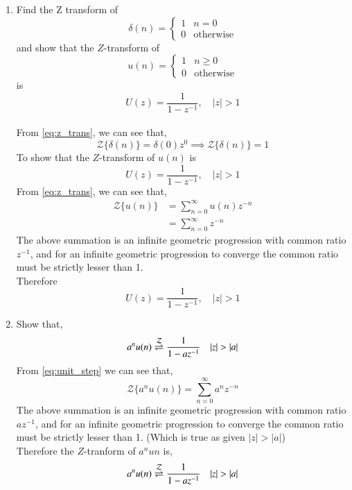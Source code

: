 \documentclass[journal,12pt,twocolumn]{IEEEtran}
\renewcommand\thesection{\arabic{section}}
\begin{document}
\begin{enumerate}[label=\thesection.\arabic*
,ref=\thesection.\theenumi]
\item Find the Z transform of 
\begin{equation}
\delta(n)
=
\begin{cases}
1 & n = 0
\\
0 & \text{otherwise}
\end{cases}
\end{equation}
and show that the $Z$-transform of
\begin{equation}
\label{eq:unit_step}
u(n)
=
\begin{cases}
1 & n \ge 0
\\
0 & \text{otherwise}
\end{cases}
\end{equation}
is
\begin{equation}
U(z) = \frac{1}{1-z^{-1}}, \quad |z|>1
\end{equation}
\\
\solution From \eqref{eq:z_trans}, we can see that,
\begin{equation}
{\mathcal {Z}}\{\delta(n)\} = \delta(0)z^{0}
\implies {\mathcal {Z}}\{\delta(n)\} = 1
\end{equation}
To show that the $Z$-transform of $u(n)$ is
\begin{equation}
U(z) = \frac{1}{1-z^{-1}}, \quad |z|>1
\end{equation}
From \eqref{eq:z_trans}, we can see that,
\begin{align}
{\mathcal {Z}}\{u(n)\} &=\sum _{n=0}^{\infty }u(n)z^{-n}
\\
&=\sum _{n=0}^{\infty }z^{-n}
\end{align}
The above summation is an infinite geometric progression with common ratio $z^{-1}$, and for an infinite geometric progression to converge the common ratio must be strictly lesser than 1.
\\
Therefore
\begin{equation}
    U(z) = \frac{1}{1-z^{-1}}, \quad |z|>1
\end{equation}


\item Show that,
\begin{equation}
\label{eq:anun}
    a^nu(n) \overset{\mathcal{Z}}{ \rightleftharpoons} \frac{1}{1-az^{-1}} \quad |z| > |a|
\end{equation}
\solution From \eqref{eq:unit_step} we can see that,
\begin{equation}
    {\mathcal {Z}}\{a^{n}u(n)\} =\sum _{n=0}^{\infty }a^{n}z^{-n}
\end{equation}
The above summation is an infinite geometric progression with common ratio $az^{-1}$, and for an infinite geometric progression to converge the common ratio must be strictly lesser than 1. (Which is true as given $|z|>|a|$)
\\
Therefore the $Z$-tranform of $a^{n}u{n}$ is,
\begin{equation}
    a^nu(n) \overset{\mathcal{Z}}{ \rightleftharpoons} \frac{1}{1-az^{-1}} \quad |z| > |a|
\end{equation}



\end{enumerate}
\end{document}
